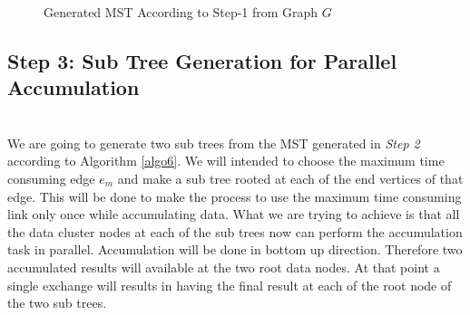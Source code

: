 \documentclass[12pt,notitlepage,oneside]{report}
\begin{document}
\begin{figure}[!htbp]
	\centering
	\caption{Generated MST According to Step-1 from Graph $G$}
	\label{MST}
\end{figure}


\subsection{\textbf{Step 3: Sub Tree Generation for Parallel Accumulation}}\hspace*{\fill} \\
We are going to generate two sub trees from the MST generated in \textit{Step 2} according to Algorithm \ref{algo6}. We will intended to choose the maximum time consuming edge $e_m$ and make a sub tree rooted at each of the end vertices of that edge. This will be done to make the process to use the maximum time consuming link only once while accumulating data. What we are trying to achieve is that all the data cluster nodes at each of the sub trees now can perform the accumulation task in parallel. Accumulation will be done in  bottom up direction. 
Therefore two accumulated results will  available at the two root data nodes. At that point a single exchange will results in having the final result at each of the root node of the two sub trees.
\end{document}
